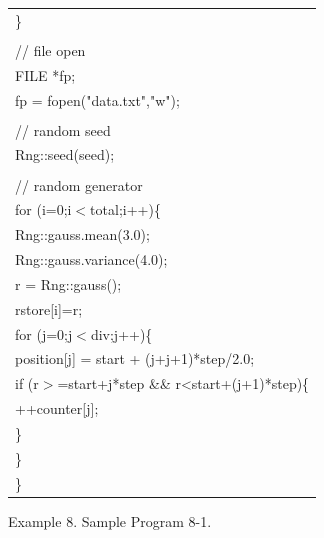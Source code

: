 {\begin{center}
\begin{tabular}{|l|}
\hspace*{10mm}\}\\
\\
\hspace*{10mm}// file open\\
\hspace*{10mm}FILE *fp;\\
\hspace*{10mm}fp = fopen("data.txt","w");\\
\\
\hspace*{10mm}// random seed\\
\hspace*{10mm}Rng::seed(seed);\\
\\
\hspace*{10mm}// random generator\\
\hspace*{10mm}for (i=0;i$<$total;i++)\{\\
\hspace*{20mm}Rng::gauss.mean(3.0);\\
\hspace*{20mm}Rng::gauss.variance(4.0);\\
\hspace*{20mm}r = Rng::gauss();\\
\hspace*{20mm}rstore[i]=r;\\
\hspace*{20mm}for (j=0;j$<$div;j++)\{\\
\hspace*{30mm}position[j] = start + (j+j+1)*step/2.0;\\
\hspace*{30mm}if (r$>$=start+j*step \&\& r<start+(j+1)*step)\{\\
\hspace*{40mm}++counter[j];\\
\hspace*{30mm}\}\\
\hspace*{20mm}\}\\
\hspace*{10mm}\}\\\hline
\end{tabular}
\vspace*{5mm}

{\small
Example 8. Sample Program 8-1.
}
\end{center}
}

\clearpage

